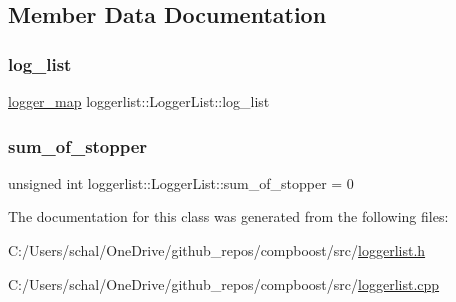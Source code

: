 \subsection{Member Data Documentation}
\mbox{\label{classloggerlist_1_1_logger_list_a56997d07c587921a70b0b2c6538ce1f0}} 
\subsubsection{\texorpdfstring{log\+\_\+list}{log\_list}}
{\footnotesize\ttfamily \mbox{\hyperlink{loggerlist_8h_afa233b5ec9ffbe76605d913e86d40fe6}{logger\+\_\+map}} loggerlist\+::\+Logger\+List\+::log\+\_\+list\hspace{0.3cm}{\ttfamily [private]}}

\mbox{\label{classloggerlist_1_1_logger_list_a39c3b4cf8f01c0e29606a9b2537da347}} 
\subsubsection{\texorpdfstring{sum\+\_\+of\+\_\+stopper}{sum\_of\_stopper}}
{\footnotesize\ttfamily unsigned int loggerlist\+::\+Logger\+List\+::sum\+\_\+of\+\_\+stopper = 0\hspace{0.3cm}{\ttfamily [private]}}



The documentation for this class was generated from the following files\+:\begin{DoxyCompactItemize}
\item 
C\+:/\+Users/schal/\+One\+Drive/github\+\_\+repos/compboost/src/\mbox{\hyperlink{loggerlist_8h}{loggerlist.\+h}}\item 
C\+:/\+Users/schal/\+One\+Drive/github\+\_\+repos/compboost/src/\mbox{\hyperlink{loggerlist_8cpp}{loggerlist.\+cpp}}\end{DoxyCompactItemize}
